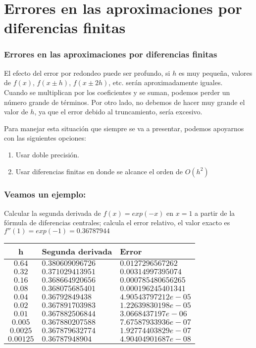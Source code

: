 \section{Errores en las aproximaciones por diferencias finitas}
\begin{frame}
\frametitle{Errores en las aproximaciones por diferencias finitas}
El efecto del error por redondeo puede ser profundo, si $h$ es muy pequeña, valores de $f(x)$, $f(x \pm h)$, $f(x \pm 2h)$, etc. serán aproximadamente iguales.
\\
\bigskip
Cuando se multiplican por los coeficientes y se suman, podemos perder un número grande de términos. Por otro lado, no debemos de hacer muy grande el valor de $h$, ya que el error debido al truncamiento, sería excesivo.
\end{frame}
\begin{frame}
Para manejar esta situación que siempre se va a presentar, podemos apoyarnos con las siguientes opciones:
\begin{enumerate}
\item Usar doble precisión.
\item Usar diferencias finitas en donde se alcance el orden de $O(h^{2})$
\end{enumerate}
\end{frame}
\begin{frame}
\frametitle{Veamos un ejemplo:}
Calcular la segunda derivada de $f(x)=exp(-x)$ en $x=1$ a partir de la fórmula de diferencias centrales; calcula el error relativo, el valor exacto es $f''(1) = exp(-1) = 0.36787944$
\end{frame}
\begin{frame}
\fontsize{12}{12}\selectfont
\begin{center}
\begin{tabular}{c | l | l}
\hline
h & Segunda derivada & Error \\ \hline
$0.64$ & $0.380609096726$ & $0.0127296567262$ \\ \hline
$0.32$ & $0.371029413951$ & $0.00314997395074$ \\ \hline
$0.16$ & $0.368664920656$ & $0.000785480656265$ \\ \hline
$0.08$ & $0.368075685401$ & $0.000196245401341$ \\ \hline
$0.04$ & $0.36792849438$ & $4.90543797212e-05$ \\ \hline
$0.02$ & $0.367891703983$ & $1.22639830198e-05$ \\ \hline
$0.01$ & $0.367882506844$ & $3.0668437197e-06$ \\ \hline
$0.005$ & $0.367880207588$ & $7.67587933936e-07$ \\ \hline
$0.0025$ & $0.367879632774$ & $1.92774403829e-07$ \\ \hline
$0.00125$ & $0.36787948904$ & $4.90404901687e-08$ \\ \hline
\end{tabular}
\end{center}
\end{frame}
